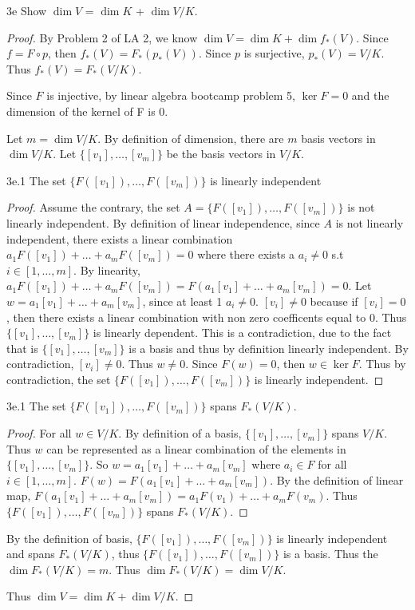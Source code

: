 \documentclass{article}
\begin{document}
\begin{claim}{3e}
    Show $\dim V$ = $\dim K$ + $\dim V/K$. 
\end{claim}
\begin{proof}
    By Problem 2 of LA 2, we know $\dim V = \dim K + \dim f_*(V)$. Since $f = F \circ p$, then $f_*(V) = F_*(p_*(V))$. Since $p$ is surjective, $p_*(V) = V/K$. Thus $f_*(V) = F_*(V/K)$.

    Since $F$ is injective, by linear algebra bootcamp problem 5, $\ker F = {0}$ and the dimension of the kernel of F is 0.

    Let $m = \dim V/K$. By definition of dimension, there are $m$ basis vectors in $\dim V/K$. Let $\{[v_1], \ldots, [v_m]\}$ be the basis vectors in $V/K$.

    \begin{claim}{3e.1}
        The set $\{F([v_1]), \ldots, F([v_m])\}$ is linearly independent
    \end{claim}
    \begin{proof}
        Assume the contrary, the set $A = \{F([v_1]), \ldots, F([v_m])\}$ is not linearly independent. By definition of linear independence, since $A$ is not linearly independent, there exists a linear combination $a_1F([v_1]) + \ldots + a_mF([v_m]) = 0$ where there exists a $a_i \neq 0$ s.t $i \in [1, \ldots, m]$. By linearity, $a_1F([v_1]) + \ldots + a_mF([v_m]) = F(a_1[v_1] + \ldots + a_m[v_m]) = 0$. Let $w = a_1[v_1] + \ldots + a_m[v_m]$, since at least 1 $a_i \neq 0$. $[v_i] \neq 0$ because if $[v_i] = 0$, then there exists a linear combination with non zero coefficents equal to 0. Thus $\{[v_1], \ldots, [v_m]\}$ is linearly dependent. This is a contradiction, due to the fact that is $\{[v_1], \ldots, [v_m]\}$ is a basis and thus by definition linearly independent. By contradiction, $[v_i] \neq 0$. Thus $w \neq 0$. Since $F(w) = 0$, then $w \in \ker F$. Thus by contradiction, the set $\{F([v_1]), \ldots, F([v_m])\}$ is linearly independent.
    \end{proof}

    \begin{claim}{3e.1}
        The set $\{F([v_1]), \ldots, F([v_m])\}$ spans $F_*(V/K)$.
    \end{claim}
    \begin{proof}
        For all $w \in V/K$. By definition of a basis, $\{[v_1], \ldots, [v_m]\}$ spans $V/K$. Thus $w$ can be represented as a linear combination of the elements in $\{[v_1], \ldots, [v_m]\}$. So $w = a_1[v_1] + \ldots + a_m[v_m]$ where $a_i \in F$ for all $i \in [1, \ldots, m]$. $F(w) = F(a_1[v_1] + \ldots + a_m[v_m])$. By the definition of linear map, $F(a_1[v_1] + \ldots + a_m[v_m]) = a_1F(v_1) + \ldots + a_mF(v_m)$. Thus $\{F([v_1]), \ldots, F([v_m])\}$ spans $F_*(V/K)$.

    \end{proof}
    
    By the definition of basis, $\{F([v_1]), \ldots, F([v_m])\}$ is linearly independent and spans $F_*(V/K)$, thus $\{F([v_1]), \ldots, F([v_m])\}$ is a basis. Thus the $\dim F_*(V/K) = m$. Thus $\dim F_*(V/K) = \dim V/K$.

    Thus $\dim V = \dim K + \dim V/K$.
\end{proof}
\end{document}

